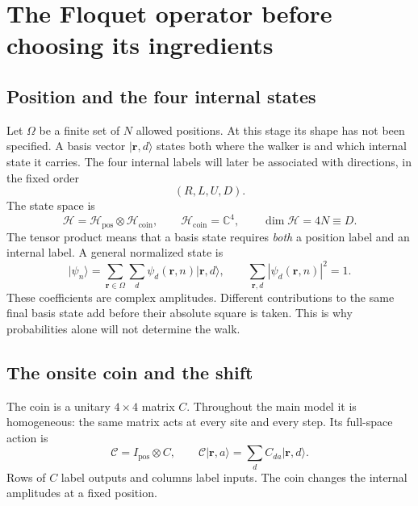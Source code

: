 \documentclass[11pt,a4paper,oneside]{report}
\newcommand{\ket}[1]{\lvert #1\rangle}
\newcommand{\HH}{\mathcal H}
\newcommand{\CC}{\mathcal C}
\newcommand{\Id}{I}
\numberwithin{equation}{chapter}
\begin{document}
\begingroup
\setlength{\parskip}{0pt}
\small
\tableofcontents
\endgroup

\clearpage
{}


\chapter{The Floquet operator before choosing its ingredients}
\label{ch:general}

\section{Position and the four internal states}

Let \(\Omega\) be a finite set of \(N\) allowed positions. At this
stage its shape has not been specified. A basis vector
\(\ket{\mathbf r,d}\) states both where the walker is and which
internal state it carries. The four internal labels will later be
associated with directions, in the fixed order
\[
(R,L,U,D).
\]
The state space is
\begin{equation}
\HH=\HH_{\mathrm{pos}}\otimes\HH_{\mathrm{coin}},\qquad
\HH_{\mathrm{coin}}=\mathbb C^4,\qquad
\dim\HH=4N\equiv D.
\end{equation}
The tensor product means that a basis state requires \emph{both}
a position label and an internal label. A general normalized state is
\begin{equation}
\ket{\psi_n}=\sum_{\mathbf r\in\Omega}\sum_d
\psi_d(\mathbf r,n)\ket{\mathbf r,d},\qquad
\sum_{\mathbf r,d}|\psi_d(\mathbf r,n)|^2=1.
\end{equation}
These coefficients are complex amplitudes. Different contributions to
the same final basis state add before their absolute square is taken.
This is why probabilities alone will not determine the walk.

\section{The onsite coin and the shift}

The coin is a unitary \(4\times4\) matrix \(C\). Throughout the main
model it is homogeneous: the same matrix acts at every site and every
step. Its full-space action is
\begin{equation}
\CC=\Id_{\mathrm{pos}}\otimes C,\qquad
\CC\ket{\mathbf r,a}=\sum_d C_{da}\ket{\mathbf r,d}.
\end{equation}
Rows of \(C\) label outputs and columns label inputs. The coin changes
the internal amplitudes at a fixed position.
\end{document}
